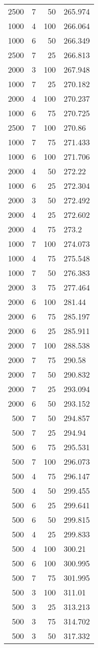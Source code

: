 \begin{tabular}{rrrl}
2500 & 7 & 50 & 265.974 \\
1000 & 4 & 100 & 266.064 \\
1000 & 6 & 50 & 266.349 \\
2500 & 7 & 25 & 266.813 \\
2000 & 3 & 100 & 267.948 \\
1000 & 7 & 25 & 270.182 \\
2000 & 4 & 100 & 270.237 \\
1000 & 6 & 75 & 270.725 \\
2500 & 7 & 100 & 270.86 \\
1000 & 7 & 75 & 271.433 \\
1000 & 6 & 100 & 271.706 \\
2000 & 4 & 50 & 272.22 \\
1000 & 6 & 25 & 272.304 \\
2000 & 3 & 50 & 272.492 \\
2000 & 4 & 25 & 272.602 \\
2000 & 4 & 75 & 273.2 \\
1000 & 7 & 100 & 274.073 \\
1000 & 4 & 75 & 275.548 \\
1000 & 7 & 50 & 276.383 \\
2000 & 3 & 75 & 277.464 \\
2000 & 6 & 100 & 281.44 \\
2000 & 6 & 75 & 285.197 \\
2000 & 6 & 25 & 285.911 \\
2000 & 7 & 100 & 288.538 \\
2000 & 7 & 75 & 290.58 \\
2000 & 7 & 50 & 290.832 \\
2000 & 7 & 25 & 293.094 \\
2000 & 6 & 50 & 293.152 \\
500 & 7 & 50 & 294.857 \\
500 & 7 & 25 & 294.94 \\
500 & 6 & 75 & 295.531 \\
500 & 7 & 100 & 296.073 \\
500 & 4 & 75 & 296.147 \\
500 & 4 & 50 & 299.455 \\
500 & 6 & 25 & 299.641 \\
500 & 6 & 50 & 299.815 \\
500 & 4 & 25 & 299.833 \\
500 & 4 & 100 & 300.21 \\
500 & 6 & 100 & 300.995 \\
500 & 7 & 75 & 301.995 \\
500 & 3 & 100 & 311.01 \\
500 & 3 & 25 & 313.213 \\
500 & 3 & 75 & 314.702 \\
500 & 3 & 50 & 317.332 \\
\bottomrule
\end{tabular}
